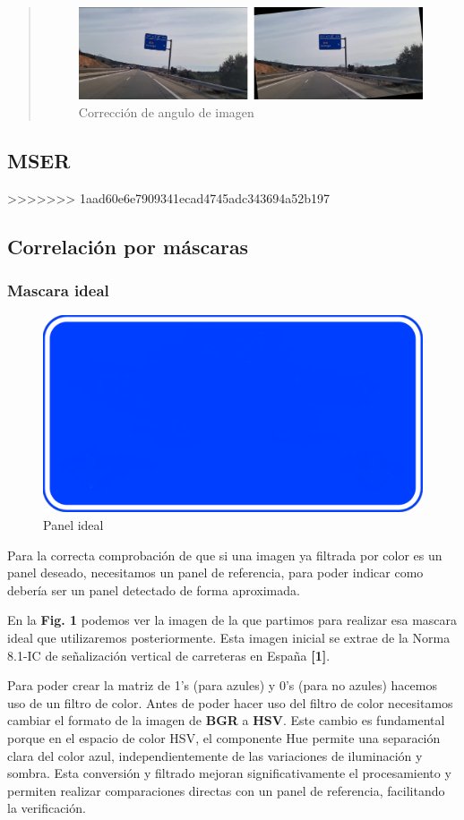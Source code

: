 \documentclass[a4paper, 12pt]{article}
\begin{document}
\begin{quote}
	\begin{figure}[h]
		\centering
		\includegraphics[width=0.7\linewidth]{img/00057_co}
		\caption{Corrección de angulo de imagen}
		\label{fig:00057co}
	\end{figure}
	
\end{quote}
\subsection{MSER}
>>>>>>> 1aad60e6e7909341ecad4745adc343694a52b197

\subsection{Correlación por máscaras}
\subsubsection{Mascara ideal}

\begin{figure}[h]
	\centering
	\includegraphics[width=0.4\linewidth]{img/ideal_mask}
	\caption{Panel ideal}
	\label{fig:idealmask}
\end{figure}

Para la correcta comprobación de que si una imagen ya filtrada por color es un panel deseado, necesitamos un panel de referencia, para poder indicar como debería ser un panel detectado de forma aproximada.


En la \textbf{Fig. 1} podemos ver la imagen de la que partimos para realizar esa mascara ideal que utilizaremos posteriormente. Esta imagen inicial se extrae de la Norma 8.1-IC de señalización vertical de carreteras en España \textbf{[1]}.

Para poder crear la matriz de 1's (para azules) y 0's (para no azules) hacemos uso de un filtro de color. Antes de poder hacer uso del filtro de color necesitamos cambiar el formato de la imagen de \textbf{BGR} a \textbf{HSV}. Este cambio es fundamental porque en el espacio de color HSV, el componente Hue permite una separación clara del color azul, independientemente de las variaciones de iluminación y sombra. Esta conversión y filtrado mejoran significativamente el procesamiento y permiten realizar comparaciones directas con un panel de referencia, facilitando la verificación.
\end{document}
